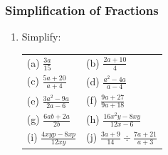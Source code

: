             \subsubsection{  Simplification of Fractions }
            \nopagebreak
      \label{m39392*id280133}\begin{enumerate}[noitemsep, label=\textbf{\arabic*}. ] 
            \label{m39392*uid53}\item Simplify:
          \begin{table}[H]
        \begin{center}
      \label{m39392*id280148}
    \noindent
      \tablelasttail{}
      \begin{xtabular}[t]{|l|l|}\hline
        (a) $\frac{3a}{15}$\hspace{1ex} &
        (b) $\frac{2a+10}{4}$\hspace{1ex}%
     \tabularnewline{}
        (c) $\frac{5a+20}{a+4}$\hspace{1ex} &
        (d) $\frac{{a}^{2}-4a}{a-4}$\hspace{1ex}%
     \tabularnewline{}
        (e) $\frac{3{a}^{2}-9a}{2a-6}$\hspace{1ex} &
        (f) $\frac{9a+27}{9a+18}$\hspace{1ex}%
     \tabularnewline{}
        (g) $\frac{6ab+2a}{2b}$\hspace{1ex} &
        (h) $\frac{16{x}^{2}y-8xy}{12x-6}$\hspace{1ex}%
     \tabularnewline{}
        (i) $\frac{4xyp-8xp}{12xy}$\hspace{1ex} &
        (j) $\frac{3a+9}{14}÷\frac{7a+21}{a+3}$\hspace{1ex}%

\end{xtabular}
\end{center}
\end{table}
\end{enumerate}
